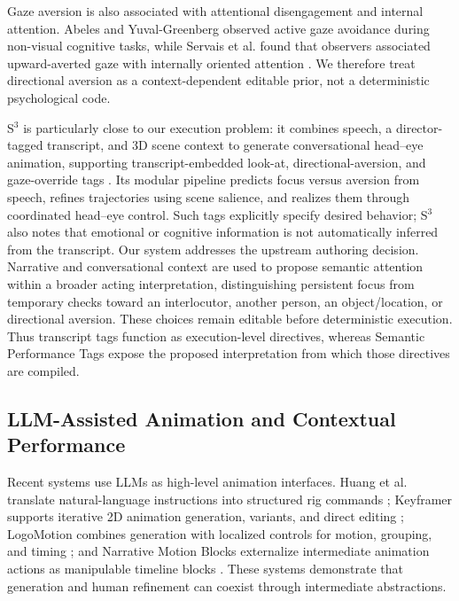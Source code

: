 Gaze aversion is also associated with attentional disengagement and internal attention. Abeles and Yuval-Greenberg observed active gaze avoidance during non-visual cognitive tasks, while Servais et al. found that observers associated upward-averted gaze with internally oriented attention \cite{abeles2017gaze,servais2022gaze}. We therefore treat directional aversion as a context-dependent editable prior, not a deterministic psychological code.

S$^3$ is particularly close to our execution problem: it combines speech, a director-tagged transcript, and 3D scene context to generate conversational head--eye animation, supporting transcript-embedded look-at, directional-aversion, and gaze-override tags \cite{pan2024s3}. Its modular pipeline predicts focus versus aversion from speech, refines trajectories using scene salience, and realizes them through coordinated head--eye control. Such tags explicitly specify desired behavior; S$^3$ also notes that emotional or cognitive information is not automatically inferred from the transcript. Our system addresses the upstream authoring decision. Narrative and conversational context are used to propose semantic attention within a broader acting interpretation, distinguishing persistent focus from temporary checks toward an interlocutor, another person, an object/location, or directional aversion. These choices remain editable before deterministic execution. Thus transcript tags function as execution-level directives, whereas Semantic Performance Tags expose the proposed interpretation from which those directives are compiled.

\subsection{LLM-Assisted Animation and Contextual Performance}

Recent systems use LLMs as high-level animation interfaces. Huang et al. translate natural-language instructions into structured rig commands \cite{huang2023realtime}; Keyframer supports iterative 2D animation generation, variants, and direct editing \cite{tseng2025keyframer}; LogoMotion combines generation with localized controls for motion, grouping, and timing \cite{liu2025logomotion}; and Narrative Motion Blocks externalize intermediate animation actions as manipulable timeline blocks \cite{bourgault2025narrative}. These systems demonstrate that generation and human refinement can coexist through intermediate abstractions.

